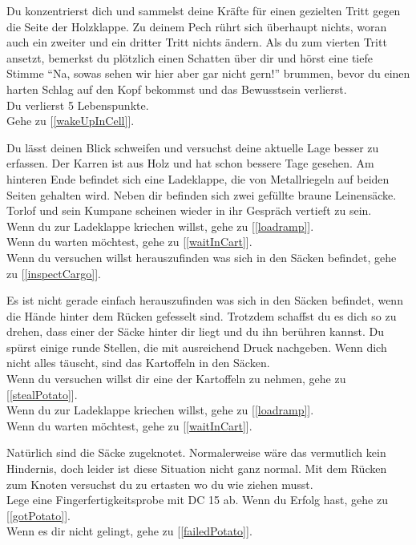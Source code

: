 Du konzentrierst dich und sammelst deine Kräfte für einen gezielten Tritt gegen die Seite der Holzklappe. Zu deinem Pech rührt sich überhaupt nichts, woran auch ein zweiter und ein dritter Tritt nichts ändern. Als du zum vierten Tritt ansetzt, bemerkst du plötzlich einen Schatten über dir und hörst eine tiefe Stimme ``Na, sowas sehen wir hier aber gar nicht gern!'' brummen, bevor du einen harten Schlag auf den Kopf bekommst und das Bewusstsein verlierst.\\
Du verlierst 5 Lebenspunkte.
\\Gehe zu [\ref{wakeUpInCell}].

Du lässt deinen Blick schweifen und versuchst deine aktuelle Lage besser zu erfassen. Der Karren ist aus Holz und hat schon bessere Tage gesehen. Am hinteren Ende befindet sich eine Ladeklappe, die von Metallriegeln auf beiden Seiten gehalten wird. Neben dir befinden sich zwei gefüllte braune Leinensäcke. Torlof und sein Kumpane scheinen wieder in ihr Gespräch vertieft zu sein.
\\Wenn du zur Ladeklappe kriechen willst, gehe zu [\ref{loadramp}].
\\Wenn du warten möchtest, gehe zu [\ref{waitInCart}].
\\Wenn du versuchen willst herauszufinden was sich in den Säcken befindet, gehe zu [\ref{inspectCargo}].


Es ist nicht gerade einfach herauszufinden was sich in den Säcken befindet, wenn die Hände hinter dem Rücken gefesselt sind. Trotzdem schaffst du es dich so zu drehen, dass einer der Säcke hinter dir liegt und du ihn berühren kannst. Du spürst einige runde Stellen, die mit ausreichend Druck nachgeben. Wenn dich nicht alles täuscht, sind das Kartoffeln in den Säcken.
\\Wenn du versuchen willst dir eine der Kartoffeln zu nehmen, gehe zu [\ref{stealPotato}].
\\Wenn du zur Ladeklappe kriechen willst, gehe zu [\ref{loadramp}].
\\Wenn du warten möchtest, gehe zu [\ref{waitInCart}].


Natürlich sind die Säcke zugeknotet. Normalerweise wäre das vermutlich kein Hindernis, doch leider ist diese Situation nicht ganz normal. Mit dem Rücken zum Knoten versuchst du zu ertasten wo du wie ziehen musst.
\\Lege eine Fingerfertigkeitsprobe mit DC 15 ab. Wenn du Erfolg hast, gehe zu [\ref{gotPotato}].
\\Wenn es dir nicht gelingt, gehe zu [\ref{failedPotato}].

